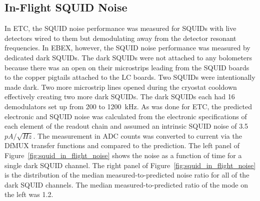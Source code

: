 

\subsection{In-Flight SQUID Noise}
\label{sec:flight_squid_noise}

In \ac{ETC}, the \ac{SQUID} noise performance was measured for \ac{SQUID}s with live detectors wired to them but demodulating away from the detector resonant frequencies. 
In \ac{EBEX}, however, the \ac{SQUID} noise performance was measured by dedicated dark \ac{SQUID}s. 
The dark \ac{SQUID}s were not attached to any bolometers because there was an open on their microstrips leading from the \ac{SQUID} boards to the copper pigtails attached to the \ac{LC} boards. 
Two \ac{SQUID}s were intentionally made dark. 
Two more microstrip lines opened during the cryostat cooldown effectively creating two more dark \ac{SQUID}s. 
The dark \ac{SQUID}s each had 16 demodulators set up from 200 to 1200~kHz.
As was done for \ac{ETC}, the predicted electronic and \ac{SQUID} noise was calculated from the electronic specifications of each element of the readout chain and assumed an intrinsic \ac{SQUID} noise of 3.5~$pA/\sqrt{Hz}$. 
The measurement in \ac{ADC} counts was converted to current via the \ac{DfMUX} transfer functions and compared to the prediction. 
The left panel of Figure~\ref{fig:squid_in_flight_noise} shows the noise as a function of time for a single dark \ac{SQUID} channel. 
The right panel of Figure~\ref{fig:squid_in_flight_noise} is the distribution of the median measured-to-predicted noise ratio for all of the dark \ac{SQUID} channels. 
The median measured-to-predicted ratio of the mode on the left was 1.2. 

